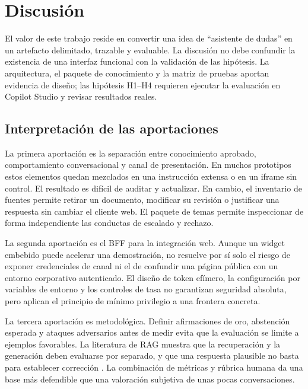 \chapter{Discusi\'on}
\label{chap:discusion}

El valor de este trabajo reside en convertir una idea de ``asistente de dudas'' en un artefacto delimitado, trazable y evaluable. La discusi\'on no debe confundir la existencia de una interfaz funcional con la validaci\'on de las hip\'otesis. La arquitectura, el paquete de conocimiento y la matriz de pruebas aportan evidencia de dise\~no; las hip\'otesis H1--H4 requieren ejecutar la evaluaci\'on en Copilot Studio y revisar resultados reales.

\section{Interpretaci\'on de las aportaciones}

La primera aportaci\'on es la separaci\'on entre conocimiento aprobado, comportamiento conversacional y canal de presentaci\'on. En muchos prototipos estos elementos quedan mezclados en una instrucci\'on extensa o en un iframe sin control. El resultado es dif\'icil de auditar y actualizar. En cambio, el inventario de fuentes permite retirar un documento, modificar su revisi\'on o justificar una respuesta sin cambiar el cliente web. El paquete de temas permite inspeccionar de forma independiente las conductas de escalado y rechazo.

La segunda aportaci\'on es el BFF para la integraci\'on web. Aunque un widget embebido puede acelerar una demostraci\'on, no resuelve por s\'i solo el riesgo de exponer credenciales de canal ni el de confundir una p\'agina p\'ublica con un entorno corporativo autenticado. El dise\~no de token ef\'imero, la configuraci\'on por variables de entorno y los controles de tasa no garantizan seguridad absoluta, pero aplican el principio de m\'inimo privilegio a una frontera concreta.

La tercera aportaci\'on es metodol\'ogica. Definir afirmaciones de oro, abstenci\'on esperada y ataques adversarios antes de medir evita que la evaluaci\'on se limite a ejemplos favorables. La literatura de RAG muestra que la recuperaci\'on y la generaci\'on deben evaluarse por separado, y que una respuesta plausible no basta para establecer correcci\'on \cite{lewis2020rag,ragas2024}. La combinaci\'on de m\'etricas y r\'ubrica humana da una base m\'as defendible que una valoraci\'on subjetiva de unas pocas conversaciones.

